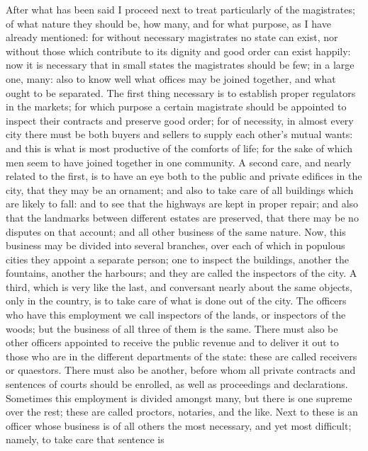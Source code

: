 
After what has been said I proceed next to treat particularly of the
magistrates; of what nature they should be, how many, and for what
purpose, as I have already mentioned: for without necessary magistrates no
state can exist, nor without those which contribute to its dignity and
good order can exist happily: now it is necessary that in small states the
magistrates should be few; in a large one, many: also to know well what
offices may be joined together, and what ought to be separated. The first
thing necessary is to establish proper regulators in the markets; for
which purpose a certain magistrate should be appointed to inspect their
contracts and preserve good order; for of necessity, in almost every city
there must be both buyers and sellers to supply each other's mutual wants:
and this is what is most productive of the comforts of life; for the sake
of which men seem to have joined together in one community. A second care,
and nearly related to the first, is to have an eye both to the public and
private edifices in the city, that they may be an ornament; and also to
take care of all buildings which are likely to fall: and to see that the
highways are kept in proper repair; and also that the landmarks between
different estates are preserved, that there may be no disputes on that
account; and all other business of the same nature. Now, this business may
be divided into several branches, over each of which in populous cities
they appoint a separate person; one to inspect the buildings, another the
fountains, another the harbours; and they are called the inspectors of the
city. A third, which is very like the last, and conversant nearly about
the same objects, only in the country, is to take care of what is done out
of the city. The officers who have this employment we call inspectors of
the lands, or inspectors of the woods; but the business of all three of
them is the same. There must also be other officers appointed to receive
the public revenue and to deliver it out to those who are in the different
departments of the state: these are called receivers or quaestors. There
must also be another, before whom all private contracts and sentences of
courts should be enrolled, as well as proceedings and declarations.
Sometimes this employment is divided amongst many, but there is one
supreme over the rest; these are called proctors, notaries, and the like.
Next to these is an officer whose business is of all others the most
necessary, and yet most difficult; namely, to take care that sentence is

